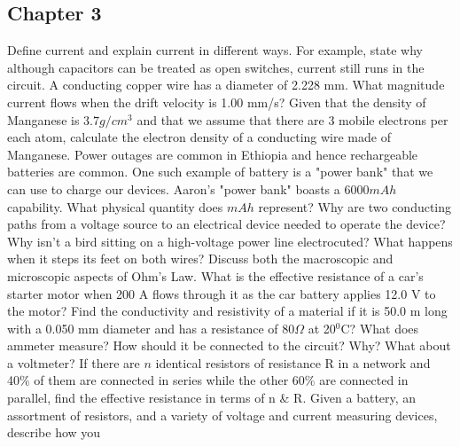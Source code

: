 \documentclass[12pt,addpoints]{exam}
\begin{document}
\begin{questions}
		\subsection*{Chapter 3}
		\question Define current and explain current in different ways. For example, state why although capacitors can be treated as open switches, current still runs in the circuit.\vspace{1.5in}
		\question A conducting copper wire has a diameter of 2.228 mm. What magnitude current flows when the drift velocity is 1.00
		mm/s?\vspace{1.5in}
		\question Given that the density of Manganese is $3.7g/cm^3$ and that we assume that there are 3 mobile electrons per each atom, calculate the electron density of a conducting wire made of Manganese.\vspace{1.5in}
		\question Power outages are common in Ethiopia and hence rechargeable batteries are common. One such example of battery is a "power bank" that we can use to charge our devices. Aaron's "power bank" boasts a $6000mAh$ capability. What physical quantity does $mAh$ represent?\vspace{1.5in}
		\question Why are two conducting paths from a voltage source to an electrical device needed to operate the device?\vspace{1.5in}
		\question Why isn’t a bird sitting on a high-voltage power line electrocuted? What happens when it steps its feet on both wires?\vspace{1.5in}
		\question Discuss both the macroscopic and microscopic aspects of Ohm's Law.\vspace{1.5in}
		\question What is the effective resistance of a car’s starter motor when 200 A flows through it as the car battery applies 12.0 V to the motor?\vspace{1.5in}
		\question Find the conductivity and resistivity of a material if it is 50.0 m long with a 0.050 mm diameter and has a resistance of 80$\Omega$ at 20$^0$C?\vspace{2in}
		\question What does ammeter measure? How should it be connected to the circuit? Why? What about a voltmeter?\vspace{1.5in}
		\question If there are $n$ identical resistors of resistance R in a network and 40\% of them are connected in series while the other 60\% are connected in parallel, find the effective resistance in terms of n \& R. \vspace{1.5in}
		\question Given a battery, an assortment of resistors, and a variety of voltage and current measuring devices, describe how you

\end{questions}
\end{document}
